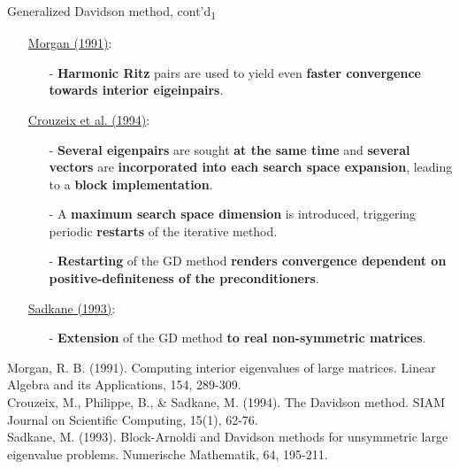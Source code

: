 \documentclass[t,usepdftitle=false]{beamer}
\begin{document}
\begin{frame}{Generalized Davidson method, cont'd\textsubscript{1}}
\begin{itemize}
\item[] \underline{Morgan (1991)}:
\begin{itemize}\normalsize
\item[-] \textbf{Harmonic Ritz} pairs are used to yield even \textbf{faster convergence towards interior eigeinpairs}.
\end{itemize}
\item[] \underline{Crouzeix et al. (1994)}:
\begin{itemize}\normalsize
\item[-] \textbf{Several eigenpairs} are sought \textbf{at the same time} and \textbf{several vectors} are \textbf{incorporated into each search space expansion}, leading to a \textbf{block implementation}.
\item[-] A \textbf{maximum search space dimension} is introduced, triggering periodic \textbf{restarts} of the iterative method.
\item[-] \textbf{Restarting} of the GD method \textbf{renders convergence dependent on positive-definiteness of the preconditioners}.
\end{itemize}
\item[] \underline{Sadkane (1993)}:
\begin{itemize}\normalsize
\item[-] \textbf{Extension} of the GD method \textbf{to real non-symmetric matrices}.
\end{itemize}
\end{itemize}\smallskip
\tiny{Morgan, R. B. (1991). Computing interior eigenvalues of large matrices. Linear Algebra and its Applications, 154, 289-309.}\tinyskip\\
\tiny{Crouzeix, M., Philippe, B., \& Sadkane, M. (1994). The Davidson method. SIAM Journal on Scientific Computing, 15(1), 62-76.}\tinyskip\\
\tiny{Sadkane, M. (1993). Block-Arnoldi and Davidson methods for unsymmetric large eigenvalue problems. Numerische Mathematik, 64, 195-211.}
\end{frame}
\end{document}
